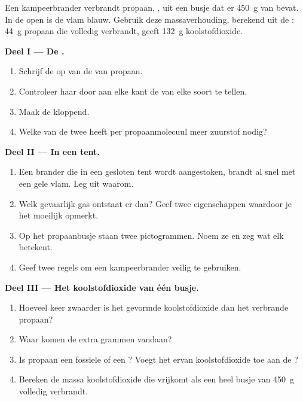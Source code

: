 \begin{problem}
\label{pb:g8:combustion-and-fuels:1}
Een kampeerbrander verbrandt propaan, , uit een busje dat er
\qty{450}{g} van bevat. In de open  is de vlam blauw. Gebruik deze
massaverhouding, berekend uit de :
\qty{44}{g} propaan die volledig verbrandt, geeft \qty{132}{g}
koolstofdioxide.

\medskip
\noindent\textbf{Deel I --- De .}
\begin{enumerate}
  \item Schrijf de  op van de  van propaan.
  \item Controleer haar door aan elke kant de  van elke soort te
        tellen.
  \item Maak de 
         kloppend. %
  \item Welke van de twee heeft per propaanmolecuul meer zuurstof nodig?
\end{enumerate}

\medskip
\noindent\textbf{Deel II --- In een tent.}
\begin{enumerate}[resume]
  \item Een brander die in een gesloten tent wordt aangestoken, brandt al
        snel met een gele vlam. Leg uit waarom.
  \item Welk gevaarlijk gas ontstaat er dan? Geef twee eigenschappen
        waardoor je het moeilijk opmerkt.
  \item Op het propaanbusje staan twee pictogrammen. Noem ze en zeg wat
        elk betekent.
  \item Geef twee regels om een kampeerbrander veilig te gebruiken.
\end{enumerate}

\medskip
\noindent\textbf{Deel III --- Het koolstofdioxide van één busje.}
\begin{enumerate}[resume]
  \item Hoeveel keer zwaarder is het gevormde koolstofdioxide dan het
        verbrande propaan?
  \item Waar komen de extra grammen vandaan?
  \item Is propaan een fossiele of een ? Voegt het
         ervan koolstofdioxide toe aan de ?
  \item Bereken de massa koolstofdioxide die vrijkomt als een heel busje
        van \qty{450}{g} volledig verbrandt.
\end{enumerate}
\end{problem}
